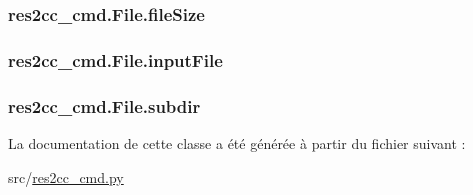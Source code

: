 \subsubsection[{file\+Size}]{\setlength{\rightskip}{0pt plus 5cm}res2cc\+\_\+cmd.\+File.\+file\+Size}\label{classres2cc__cmd_1_1_file_ad8db4b9b56241aaeb9a03ace54ba2d52}
\hypertarget{classres2cc__cmd_1_1_file_a03df7c3cbcb26806078400c89aaedc22}{}
\subsubsection[{input\+File}]{\setlength{\rightskip}{0pt plus 5cm}res2cc\+\_\+cmd.\+File.\+input\+File}\label{classres2cc__cmd_1_1_file_a03df7c3cbcb26806078400c89aaedc22}
\hypertarget{classres2cc__cmd_1_1_file_ae6919ea0849ff51ff2679de78b50f44c}{}
\subsubsection[{subdir}]{\setlength{\rightskip}{0pt plus 5cm}res2cc\+\_\+cmd.\+File.\+subdir}\label{classres2cc__cmd_1_1_file_ae6919ea0849ff51ff2679de78b50f44c}


La documentation de cette classe a été générée à partir du fichier suivant \+:\begin{DoxyCompactItemize}
\item 
src/\hyperlink{res2cc__cmd_8py}{res2cc\+\_\+cmd.\+py}\end{DoxyCompactItemize}
